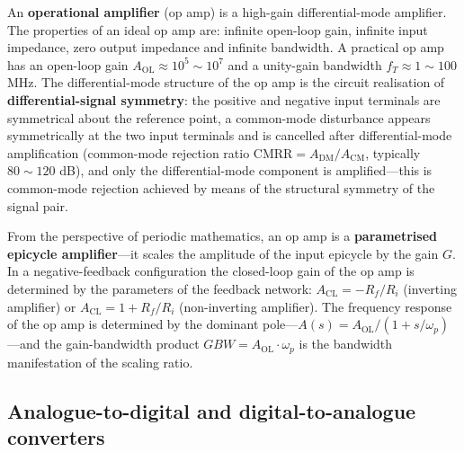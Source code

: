 \begin{definition}\label{def:op_amp}
An \textbf{operational amplifier} (op amp) is a high-gain differential-mode amplifier. The properties of an ideal op amp are: infinite open-loop gain, infinite input impedance, zero output impedance and infinite bandwidth. A practical op amp has an open-loop gain $A_{\text{OL}} \approx 10^5 \sim 10^7$ and a unity-gain bandwidth $f_T \approx 1 \sim 100$ MHz. The differential-mode structure of the op amp is the circuit realisation of \textbf{differential-signal symmetry}: the positive and negative input terminals are symmetrical about the reference point, a common-mode disturbance appears symmetrically at the two input terminals and is cancelled after differential-mode amplification (common-mode rejection ratio $\text{CMRR} = A_{\text{DM}}/A_{\text{CM}}$, typically $80 \sim 120$ dB), and only the differential-mode component is amplified---this is common-mode rejection achieved by means of the structural symmetry of the signal pair.

From the perspective of periodic mathematics, an op amp is a \textbf{parametrised epicycle amplifier}---it scales the amplitude of the input epicycle by the gain $G$. In a negative-feedback configuration the closed-loop gain of the op amp is determined by the parameters of the feedback network: $A_{\text{CL}} = -R_f/R_i$ (inverting amplifier) or $A_{\text{CL}} = 1 + R_f/R_i$ (non-inverting amplifier). The frequency response of the op amp is determined by the dominant pole---$A(s) = A_{\text{OL}}/(1 + s/\omega_p)$---and the gain-bandwidth product $GBW = A_{\text{OL}} \cdot \omega_p$ is the bandwidth manifestation of the scaling ratio.
\end{definition}

\subsection{Analogue-to-digital and digital-to-analogue converters}

